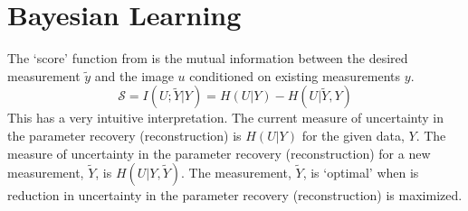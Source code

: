 \documentclass{article}         %
\theoremstyle{definition}
\theoremstyle{remark}
\begin{document}
\section{Bayesian Learning}

The `score' function from 
\cite{seeger2010optimization} is the mutual information between the desired measurement $\tilde{y}$
and the image $u$ conditioned on existing measurements $y$.
\[ 
\mathcal{S}   =  I(U;\tilde{Y}|Y) =  H(U|Y) - H(U|\tilde{Y},Y)   
\]
This has a very intuitive interpretation.  The current measure of uncertainty
in the parameter recovery (reconstruction) is $H(U|Y)$ for the given data, $Y$. 
The measure of uncertainty in the parameter recovery (reconstruction) for
 a new measurement, $\tilde{Y}$, is $H(U|Y,\tilde{Y})$.
The measurement, $\tilde{Y}$, is `optimal' when is reduction
in uncertainty in the parameter recovery (reconstruction) is maximized.
\end{document}
